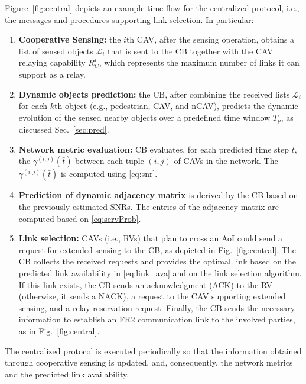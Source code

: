 \documentclass[journal]{IEEEtran}
\begin{document}
Figure~\ref{fig:central} depicts an example time flow for the centralized protocol, i.e., the messages and procedures supporting link selection. In particular: 
\begin{enumerate}[wide]
    \item \textbf{Cooperative Sensing:} the $i$th CAV, after the sensing operation, obtains a list of sensed objects $\mathcal{L}_i$ that is sent to the CB together with the CAV relaying capability $R_C^i$, which represents the maximum number of links it can support as a relay. 
    \item \textbf{Dynamic objects prediction:} the CB, after combining the received lists $\mathcal{L}_i$ for each $k$th object (e.g., pedestrian, CAV, and nCAV), predicts the dynamic evolution of the sensed nearby objects over a predefined time window $T_p$, as discussed Sec.~\ref{sec:pred}.
    
    \item \textbf{Network metric evaluation:}  CB evaluates, for each predicted time step $\bar{t}$, the $\gamma^{(i,j)}(\bar{t})$ between each tuple $(i,j)$ of CAVs in the network. The $\gamma^{(i,j)}(\bar{t})$ is computed using \eqref{eq:snr}.
    
    \item \textbf{Prediction of dynamic adjacency matrix} is derived by the CB based on the previously estimated SNRs. The entries of the adjacency matrix are computed based on \eqref{eq:servProb}.
    
    \item \textbf{Link selection:} CAVs (i.e., RVs) that plan to cross an AoI could send a request for extended sensing to the CB, as depicted in Fig.~\ref{fig:central}. The CB collects the received requests and provides the optimal link based on the predicted link availability in \eqref{eq:link_ava} and on the link selection algorithm. If this link exists, the CB sends an acknowledgment (ACK) to the RV (otherwise, it sends a NACK), a request to the CAV supporting extended sensing, and a relay reservation request. Finally, the CB sends the necessary information to establish an FR2 communication link to the involved parties, as in Fig.~\ref{fig:central}.
\end{enumerate}

The centralized protocol is executed periodically so that the information obtained through cooperative sensing is updated, and, consequently, the network metrics and the predicted link availability.
\end{document}
